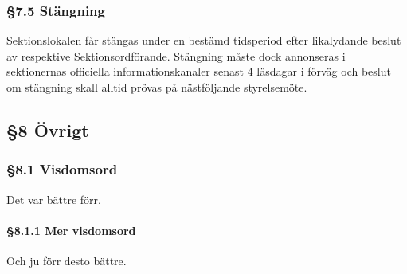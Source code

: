 \subsubsection{§7.5 Stängning}

Sektionslokalen får stängas under en bestämd tidsperiod efter likalydande beslut av respektive Sektionsordförande. Stängning måste dock annonseras i sektionernas officiella informationskanaler senast 4 läsdagar i förväg och beslut om stängning skall alltid prövas på nästföljande styrelsemöte.

\subsection{§8 Övrigt}

\subsubsection{§8.1 Visdomsord}

Det var bättre förr.

\paragraph{§8.1.1 Mer visdomsord}

Och ju förr desto bättre.


